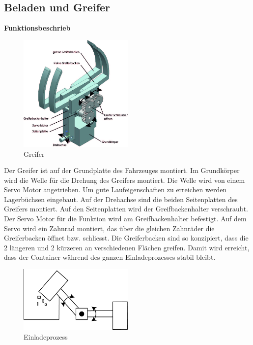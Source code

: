 \subsection{Beladen und Greifer}
\textbf{Funktionsbeschrieb}
\begin{figure}[H]
\centering
\includegraphics[width=0.5\textwidth]{03_Loesungskonzept/pictures/greifer3.jpg}
\caption{Greifer}
\end{figure}\flushleft
%
Der Greifer ist auf der Grundplatte des Fahrzeuges montiert. Im Grundkörper wird die Welle für die Drehung des Greifers montiert. Die Welle wird von einem Servo Motor angetrieben. Um gute Laufeigenschaften zu erreichen werden Lagerbüchsen eingebaut. Auf der Drehachse sind die beiden Seitenplatten des Greifers montiert. Auf den Seitenplatten wird der Greifbackenhalter verschraubt.  Der Servo Motor für die Funktion \grqq{} wird am Greifbackenhalter befestigt. Auf dem Servo wird ein Zahnrad montiert, das über die gleichen Zahnräder die Greiferbacken öffnet bzw. schliesst. Die Greiferbacken sind so konzipiert, dass die 2 längeren und 2 kürzeren an verschiedenen Flächen greifen. Damit wird erreicht, dass der Container während des ganzen Einladeprozesses stabil bleibt.
%
\begin{figure}[H]
\centering
\includegraphics[width=0.5\textwidth]{03_Loesungskonzept/pictures/Beladen_1.png}
\caption{Einladeprozess}
\end{figure}\flushleft
